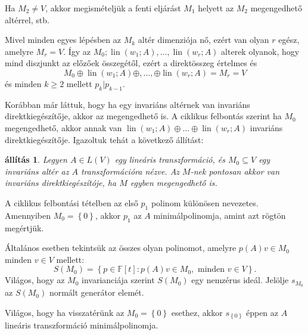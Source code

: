 \documentclass[a4paper, showtrims]{memoir}
\makeatletter
\renewenvironment{proof}[1][\proofname]
    {\par\pushQED{\qed}%
    \normalfont \topsep6\p@\@plus6\p@\relax
    \trivlist
    \item[\hskip\labelsep
        \itshape
    #1\@addpunct{:}]\ignorespaces}
    {\popQED\endtrivlist\@endpefalse}
\theoremstyle{plain}
\newtheorem{proposition}{állítás}[chapter]
\theoremstyle{remark}
\theoremstyle{definition}
\DeclareMathOperator{\lin}{lin}
\makeatother
\begin{document}
\begin{proof}
    Ha $M_2\neq V$, akkor megismételjük a fenti eljárást $M_1$ helyett az $M_2$ megengedhető altérrel, stb.

    Mivel minden egyes lépésben az $M_k$ altér dimenziója nő, ezért van olyan $r$ egész, amelyre $M_r=V$.
    Így az $M_0;\lin\left( w_1;A \right),\dots,\lin\left( w_r;A \right)$ alterek olyanok, 
    hogy mind diszjunkt az előzőek összegétől, ezért a direktösszeg értelmes és
    \[
        M_0\oplus\lin\left( w_1;A \right)\oplus,\ldots,\oplus\lin\left( w_r;A \right)=M_r=V
    \]
    és minden $k\geq 2$ mellett $p_{k}|p_{k-1}$.
\end{proof}

Korábban már láttuk, hogy ha egy invariáns altérnek van invariáns direktkiegészítője, akkor az megengedhető is.
A ciklikus felbontás szerint ha $M_0$ megengedhető, akkor annak van $\lin\left( w_1;A \right)\oplus\ldots\oplus\lin\left( w_r;A \right)$ invariáns direktkiegészítője.
Igazoltuk tehát a következő állítást:
\begin{proposition}
    Legyen $A\in L\left( V \right)$ egy lineáris transzformáció,
    és $M_0\subseteq V$ egy invariáns altér az $A$ transzformációra nézve.
    Az $M$-nek pontosan akkor van invariáns direktkiegészítóje, ha $M$ egyben megengedhető is.
\end{proposition}

A ciklikus felbontási tételben az első $p_1$ polinom különösen nevezetes. 
Amennyiben $M_0=\left\{ 0 \right\}$, akkor $p_1$ az $A$ minimálpolinomja,
amint azt rögtön megértjük.

Általános esetben tekintsük az összes olyan polinomot, amelyre $p\left( A \right)v\in M_0$ minden $v\in V$ mellett:
\[
S\left( M_0 \right)=\left\{ p\in\mathbb{F}\left[ t \right]:p\left( A \right)v\in M_0,\text{ minden } v\in V \right\}.
\]
Világos, hogy az $M_0$ invarianciája szerint $S\left( M_0 \right)$ egy nemzérus ideál.
Jelölje $s_{M_0}$ az $S\left( M_0 \right)$ normált generátor elemét.

Világos, hogy ha visszatérünk az $M_0=\left\{ 0 \right\}$ esethez,
akkor $s_{\left\{ 0 \right\}}$ éppen az $A$ lineáris transzformáció minimálpolinomja.
\end{document}
